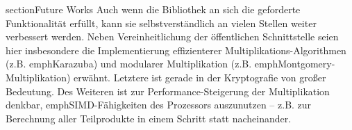 section{Future Works}
Auch wenn die Bibliothek an sich die geforderte Funktionalität erfüllt, kann sie selbstverständlich an vielen Stellen weiter verbessert werden. 
Neben Vereinheitlichung der öffentlichen Schnittstelle seien hier insbesondere die Implementierung effizienterer Multiplikations-Algorithmen (z.B. emph{Karazuba}) und modularer Multiplikation (z.B. emph{Montgomery-Multiplikation}) erwähnt. Letztere ist gerade in der Kryptografie von großer Bedeutung.
Des Weiteren ist zur Performance-Steigerung der Multiplikation denkbar, emph{SIMD}-Fähigkeiten des Prozessors auszunutzen -- z.B. zur Berechnung aller Teilprodukte in einem Schritt statt nacheinander.